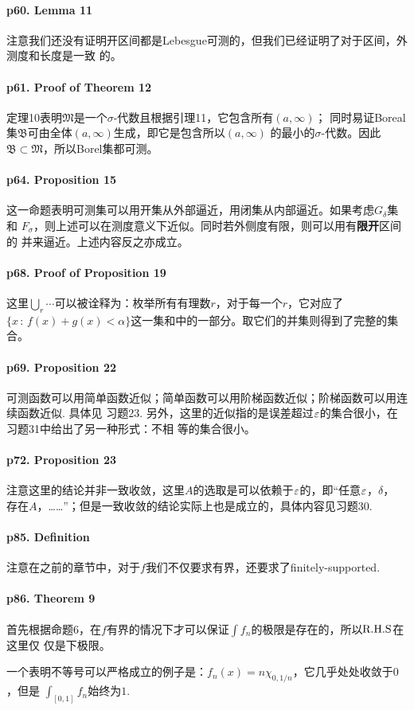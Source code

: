   \paragraph{p60. Lemma 11}
    注意我们还没有证明开区间都是Lebesgue可测的，但我们已经证明了对于区间，外测度和长度是一致
    的。

  \paragraph{p61. Proof of Theorem 12}
    定理10表明$\mathfrak{M}$是一个$\sigma$-代数且根据引理11，它包含所有$(a,\infty)$；
    同时易证Boreal集$\mathfrak{B}$可由全体$(a,\infty)$生成，即它是包含所以$(a,\infty)$
    的最小的$\sigma$-代数。因此$\mathfrak{B}\subset\mathfrak{M}$，所以Borel集都可测。

  \paragraph{p64. Proposition 15}
    这一命题表明可测集可以用开集从外部逼近，用闭集从内部逼近。如果考虑$G_\delta$集和
    $F_\sigma$，则上述可以在测度意义下近似。同时若外侧度有限，则可以用有\textbf{限开}区间的
    并来逼近。上述内容反之亦成立。

  \paragraph{p68. Proof of Proposition 19}
    这里$\bigcup_r\cdots$可以被诠释为：枚举所有有理数$r$，对于每一个$r$，它对应了$\{x\,:
    \,f(x)+g(x)<\alpha\}$这一集和中的一部分。取它们的并集则得到了完整的集合。

  \paragraph{p69. Proposition 22}
    可测函数可以用简单函数近似；简单函数可以用阶梯函数近似；阶梯函数可以用连续函数近似. 具体见
    习题23. 另外，这里的近似指的是误差超过$\varepsilon$的集合很小，在习题31中给出了另一种形式：不相
    等的集合很小。

  \paragraph{p72. Proposition 23}
    注意这里的结论并非一致收敛，这里$A$的选取是可以依赖于$\varepsilon$的，即“任意$\varepsilon$，$\delta$，
    存在$A$，……”；但是一致收敛的结论实际上也是成立的，具体内容见习题30.

  \paragraph{p85. Definition}
    注意在之前的章节中，对于$f$我们不仅要求有界，还要求了finitely-supported.

  \paragraph{p86. Theorem 9}
    首先根据命题6，在$f$有界的情况下才可以保证$\int f_n$的极限是存在的，所以$\text{R.H.S}$在这里仅
    仅是下极限。\par
    一个表明不等号可以严格成立的例子是：$f_n(x)=n\chi_{0,1/n}$，它几乎处处收敛于$0$，但是
    $\int_[0,1] f_n$始终为$1$. 




